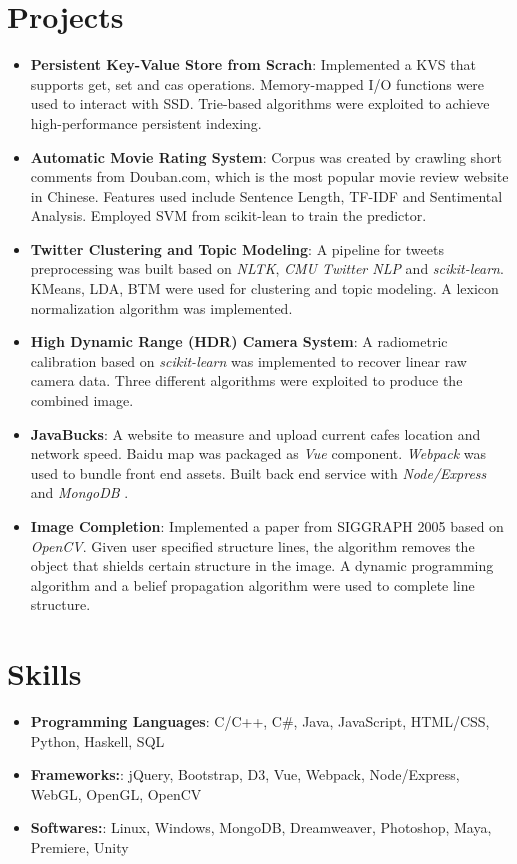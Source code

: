 \documentclass[letterpaper,11pt]{article}
\newcommand{\resumeItem}[2]{
  \item\small{
    \textbf{#1}{: #2 \vspace{-1pt}}
  }
}
\newcommand{\resumeSubItem}[2]{\resumeItem{#1}{#2}\vspace{-0pt}}
\newcommand{\resumeSubHeadingListStart}{\begin{itemize}[leftmargin=*]}
\newcommand{\resumeSubHeadingListEnd}{\end{itemize}}
\begin{document}
\section{Projects}
  \resumeSubHeadingListStart
    \resumeSubItem{Persistent Key-Value Store from Scrach}
      {Implemented a KVS that supports get, set and cas operations. Memory-mapped I/O functions were used to interact with SSD. Trie-based algorithms were exploited to achieve high-performance persistent indexing. }  
    \resumeSubItem{Automatic Movie Rating System}
      {Corpus was created by crawling short comments from Douban.com, which is the most popular movie review website in Chinese. Features used include Sentence Length, TF-IDF and Sentimental Analysis. Employed SVM from scikit-lean to train the predictor.}  
    \resumeSubItem{Twitter Clustering and Topic Modeling}
      {A pipeline for tweets preprocessing was built based on {\it NLTK}, {\it CMU Twitter NLP} and {\it scikit-learn}. KMeans, LDA, BTM were used for clustering and topic modeling. A lexicon normalization algorithm was implemented.}
    \resumeSubItem{High Dynamic Range (HDR) Camera System}{
       A radiometric calibration based on {\it scikit-learn} was implemented to recover linear raw camera data. Three different algorithms were exploited to produce the combined image.
    }
    \resumeSubItem{JavaBucks}
      {A website to measure and upload current cafes location and network speed. Baidu map was packaged as {\it Vue} component. {\it Webpack} was used to bundle front end assets. Built back end service with {\it Node/Express} and {\it MongoDB} .}
    \resumeSubItem{Image Completion}
      {Implemented a paper from SIGGRAPH 2005 based on {\it OpenCV}. Given user specified structure lines, the algorithm removes the object that shields certain structure in the image. A dynamic programming algorithm and a belief propagation algorithm were used to complete line structure. }
    
  \resumeSubHeadingListEnd

\section{Skills}
  \resumeSubHeadingListStart 
    \resumeSubItem{Programming Languages}
      {C/C++, C\#, Java, JavaScript, HTML/CSS, Python, Haskell, SQL}
    \resumeSubItem{Frameworks:}
      {jQuery, Bootstrap, D3, Vue, Webpack, Node/Express, WebGL, OpenGL, OpenCV}
    \resumeSubItem{Softwares:}
      {Linux, Windows, MongoDB, Dreamweaver, Photoshop, Maya, Premiere, Unity}
  \resumeSubHeadingListEnd
\end{document}
